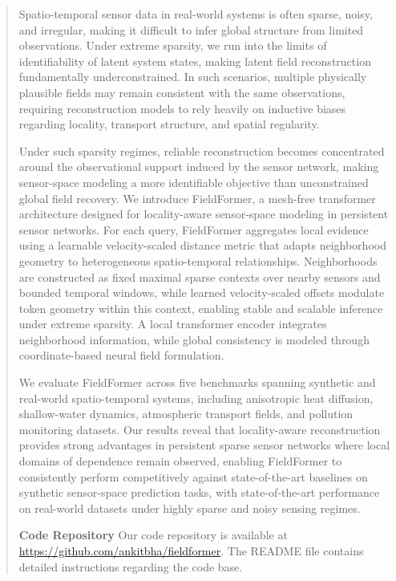 \begin{abstract}
Spatio-temporal sensor data in real-world systems is often sparse, noisy, and irregular, making it difficult to infer global structure from limited observations. Under extreme sparsity, we run into the limits of identifiability of latent system states, making latent field reconstruction fundamentally underconstrained. In such scenarios, multiple physically plausible fields may remain consistent with the same observations, requiring reconstruction models to rely heavily on inductive biases regarding locality, transport structure, and spatial regularity. 

Under such sparsity regimes, reliable reconstruction becomes concentrated around the observational support induced by the sensor network, making sensor-space modeling a more identifiable objective than unconstrained global field recovery. We introduce FieldFormer, a mesh-free transformer architecture designed for locality-aware sensor-space modeling in persistent sensor networks. For each query, FieldFormer aggregates local evidence using a learnable velocity-scaled distance metric that adapts neighborhood geometry to heterogeneous spatio-temporal relationships. Neighborhoods are constructed as fixed maximal sparse contexts over nearby sensors and bounded temporal windows, while learned velocity-scaled offsets modulate token geometry within this context, enabling stable and scalable inference under extreme sparsity. A local transformer encoder integrates neighborhood information, while global consistency is modeled through coordinate-based neural field formulation.

We evaluate FieldFormer across five benchmarks spanning synthetic and real-world spatio-temporal systems, including anisotropic heat diffusion, shallow-water dynamics, atmospheric transport fields, and pollution monitoring datasets. Our results reveal that locality-aware reconstruction provides strong advantages in persistent sparse sensor networks where local domains of dependence remain observed, enabling FieldFormer to consistently perform competitively against state-of-the-art baselines on synthetic sensor-space prediction tasks, with state-of-the-art performance on real-world datasets under highly sparse and noisy sensing regimes.

\noindent\textbf{Code Repository}
Our code repository is available at \url{https://github.com/ankitbha/fieldformer}. The README file contains detailed instructions regarding the code base.
\end{abstract}
